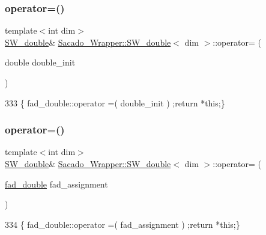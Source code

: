 \subsubsection{\texorpdfstring{operator=()}{operator=()}\hspace{0.1cm}{\footnotesize\ttfamily [1/2]}}
{\footnotesize\ttfamily template$<$int dim$>$ \\
\hyperlink{classSacado__Wrapper_1_1SW__double}{S\+W\+\_\+double}\& \hyperlink{classSacado__Wrapper_1_1SW__double}{Sacado\+\_\+\+Wrapper\+::\+S\+W\+\_\+double}$<$ dim $>$\+::operator= (\begin{DoxyParamCaption}\item[{double}]{double\+\_\+init }\end{DoxyParamCaption})\hspace{0.3cm}{\ttfamily [inline]}}


\begin{DoxyCode}
333 \{ fad\_double::operator =( double\_init ) ;\textcolor{keywordflow}{return} *\textcolor{keyword}{this};\}
\end{DoxyCode}
\mbox{\label{classSacado__Wrapper_1_1SW__double_ae9d242c29208f994f2eaabd9f5d5fa3c}} 
\subsubsection{\texorpdfstring{operator=()}{operator=()}\hspace{0.1cm}{\footnotesize\ttfamily [2/2]}}
{\footnotesize\ttfamily template$<$int dim$>$ \\
\hyperlink{classSacado__Wrapper_1_1SW__double}{S\+W\+\_\+double}\& \hyperlink{classSacado__Wrapper_1_1SW__double}{Sacado\+\_\+\+Wrapper\+::\+S\+W\+\_\+double}$<$ dim $>$\+::operator= (\begin{DoxyParamCaption}\item[{\hyperlink{Sacado-auxiliary__functions_8h_a868b94676739e612d9c95940e70892a9}{fad\+\_\+double}}]{fad\+\_\+assignment }\end{DoxyParamCaption})\hspace{0.3cm}{\ttfamily [inline]}}


\begin{DoxyCode}
334 \{ fad\_double::operator =( fad\_assignment ) ;\textcolor{keywordflow}{return} *\textcolor{keyword}{this};\}
\end{DoxyCode}
\mbox{\label{classSacado__Wrapper_1_1SW__double_a36ced4218d40104fd8e548039a97cfb8}} 
